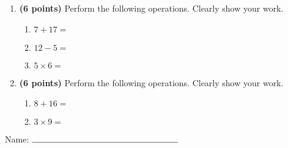 \documentclass[12pt]{amsart}
\begin{document}
\newpage
\begin{enumerate}
\item {\bf (6 points)} 
 Perform the following operations. Clearly show your work. \begin{enumerate}


\def \a{7}\def \b{17}\def \apb{24}

 
\item $\a + \b = $

\vspace{2cm}
\def \a{12}\def \dif{7}\def \b{5}

 
\item $\a - \b = $

\vspace{2cm}
\def \a{5}\def \b{6}\def \ab{11}

 
\item $\a \times \b = $ 

\vspace{2cm}
\def \vshift{3}\def \hshift{-4}\def \chang{-1}\def \findval{-5}\def \yval{5}

 
\end{enumerate}


\newpage
\item {\bf (6 points)} 
 Perform the following operations. Clearly show your work. \begin{enumerate}


\def \a{8}\def \b{16}\def \apb{24}

 
\item $\a + \b = $

\vspace{2cm}
\def \a{3}\def \b{9}\def \ab{12}

 
\item $\a \times \b = $ 

\vspace{2cm}
\def \vshift{1}\def \hshift{-4}\def \chang{-1}\def \findval{-5}\def \yval{3}

 
\end{enumerate}


\newpage\end{enumerate}\graphicspath{{/Users/jilan/Downloads/Randomizer/Randomizer/Sample Course/Sample Assessment 2/}}\setcounter{page}{1}


\thispagestyle{fancy}

 
\noindent Name: $\rule{6cm}{0.15mm}$

\vspace{.2cm}
\end{document}
